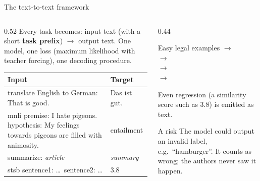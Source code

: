 \documentclass[aspectratio=169,11pt]{beamer}
\begin{document}
\begin{frame}{The text-to-text framework}
  \begin{columns}[T]
    \begin{column}{0.52\textwidth}
      \small
      Every task becomes: input text (with a short \textbf{task prefix}) $\to$ output text. One model, one loss (maximum likelihood with teacher forcing), one decoding procedure.
      \vspace{1mm}

      \scriptsize
      \begin{tabular}{@{}p{4.3cm}p{1.6cm}@{}}
        \toprule
        Input & Target\\
        \midrule
        translate English to German: That is good. & Das ist gut.\\
        mnli premise: I hate pigeons. hypothesis: My feelings towards pigeons are filled with animosity. & entailment\\
        summarize: \emph{article} & \emph{summary}\\
        stsb sentence1: \ldots\ sentence2: \ldots & 3.8\\
        \bottomrule
      \end{tabular}
    \end{column}
    \begin{column}{0.44\textwidth}
      \begin{exampleblock}{Easy legal examples}
        \small
         $\to$ \\
         $\to$ \\
         $\to$ \\
         $\to$ 
        \vspace{1mm}

        Even regression (a similarity score such as 3.8) is emitted as text.
      \end{exampleblock}
      \begin{alertblock}{A risk}
        \small
        The model could output an invalid label, e.g.\ ``hamburger''. It counts as wrong; the authors never saw it happen.
      \end{alertblock}
    \end{column}
  \end{columns}
\end{frame}
\end{document}

